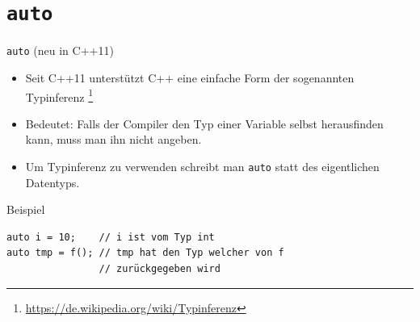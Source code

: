 \documentclass[presentation]{beamer}
\begin{document}
\section{\texttt{auto}}
\label{sec:org0a020ee}
\begin{frame}[fragile,label={sec:orgc67a82e}]{{\color{solarizedYellow}\texttt{auto} }(neu in C++11)}
 \begin{itemize}
\item Seit C++11 unterstützt C++ eine einfache Form der sogenannten
\alert{Typinferenz} \footnote{\href{https://de.wikipedia.org/wiki/Typinferenz}{https://de.wikipedia.org/wiki/Typinferenz}}
\item Bedeutet: Falls der Compiler den Typ einer Variable selbst
herausfinden kann, muss man ihn nicht angeben.
\item Um Typinferenz zu verwenden schreibt man {\color{solarizedYellow}\texttt{auto} }statt des
eigentlichen Datentyps.
\end{itemize}
\begin{block}{Beispiel}
\begin{verbatim}
auto i = 10;    // i ist vom Typ int
auto tmp = f(); // tmp hat den Typ welcher von f
                // zurückgegeben wird
\end{verbatim}
\end{block}
\end{frame}
\end{document}

